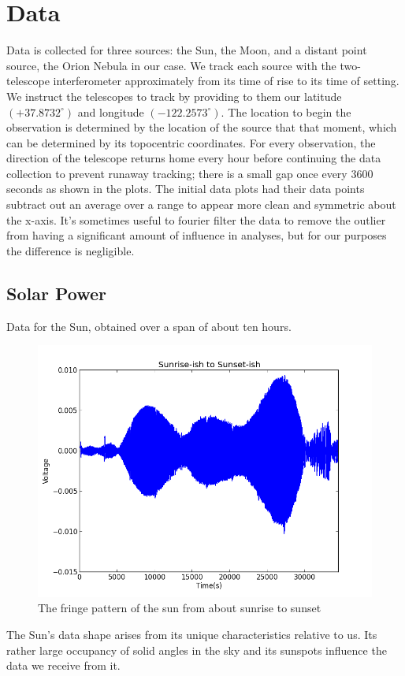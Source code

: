 \documentclass{article}
\begin{document}
\section{Data}
Data is collected for three sources: the Sun, the Moon, and a distant
point source, the Orion Nebula in our case. We track each source with
the two-telescope interferometer approximately from its time of rise to
its time of setting. We instruct the telescopes to track by providing to
them our latitude $(+37.8732^{\circ})$ and longitude
$(-122.2573^{\circ})$. The location to begin the observation is
determined by the location of the source that that moment, which can be
determined by its topocentric coordinates. For every observation, the
direction of the telescope returns home every hour before continuing the
data collection to prevent runaway tracking; there is a small gap once
every 3600 seconds as shown in the plots. The initial data plots had
their data points subtract out an average over a range to appear more
clean and symmetric about the x-axis. It's sometimes useful to fourier
filter the data to remove the outlier from having a significant amount
of influence in analyses, but for our purposes the difference is
negligible. 
\subsection{Solar Power}
Data for the Sun, obtained over a span of about ten hours.
\begin{figure}[H]
\centering
\includegraphics[width=.9\textwidth]{sun.png}
\caption{The fringe pattern of the sun from about sunrise to sunset}
\end{figure}
The Sun's data shape arises from its unique characteristics relative to
us. Its rather large occupancy of solid angles in the sky and its
sunspots influence the data we receive from it.
\end{document}

